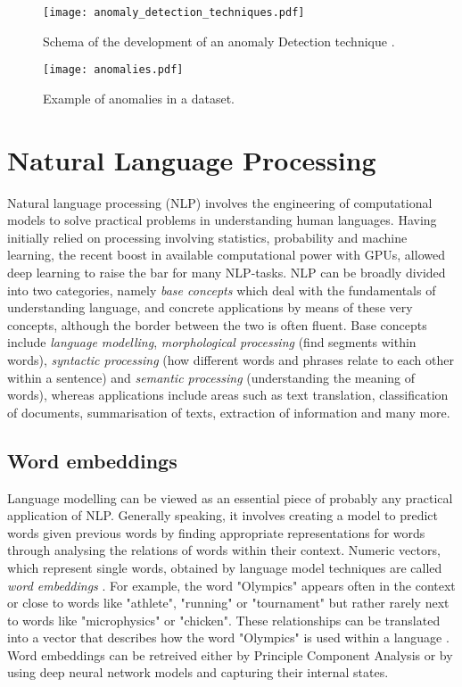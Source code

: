\begin{figure}[h]
  \centering
\texttt{[image: anomaly\_detection\_techniques.pdf]}\\ 
  \caption{Schema of the development of an anomaly Detection technique \cite{chandola2009anomaly}.}
  \label{fig:anomaly_technique}
\end{figure}

\begin{figure}[h]
  \centering
  \texttt{[image: anomalies.pdf]}\\
  \caption{Example of anomalies in a dataset.}
  \label{fig:anomaly_dataset}
\end{figure}


\section{Natural Language Processing \label{sec:natural-language-processing}}

Natural language processing (NLP) involves the engineering of computational models to solve practical problems in understanding human languages. Having initially relied on processing involving statistics, probability and machine learning, the recent boost in available computational power with GPUs, allowed deep learning to raise the bar for many NLP-tasks. NLP can be broadly divided into two categories, namely \textit{base concepts} which deal with the fundamentals of understanding language, and concrete applications by means of these very concepts, although the border between the two is often fluent. Base concepts include \textit{language modelling}, \textit{morphological processing} (find segments within words), \textit{syntactic processing} (how different words and phrases relate to each other within a sentence) and \textit{semantic processing} (understanding the meaning of words), whereas applications include areas such as text translation, classification of documents, summarisation of texts, extraction of information and many more.
\subsection{Word embeddings}
Language modelling can be viewed as an essential piece of probably any practical application of NLP. Generally speaking, it involves creating a model to predict words given previous words by finding appropriate representations for words through analysing the relations of words within their context. Numeric vectors, which represent single words, obtained by language model techniques are called \textit{word embeddings} \cite{otter2020survey}. For example, the word "Olympics" appears often in the context or close to words like "athlete", "running" or "tournament" but rather rarely next to words like "microphysics" or "chicken". These relationships can be translated into a vector that describes how the word "Olympics" is used within a language \cite{mittechnologyreviewkingqueen}. Word embeddings can be retreived either by Principle Component Analysis or by using deep neural network models and capturing their internal states.
